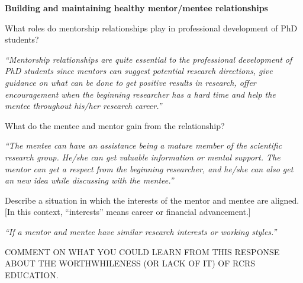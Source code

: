 \documentclass[portrait,11pt]{seminar}
\begin{document}
\bs
{\bf Building and maintaining healthy mentor/mentee relationships
}

\medskip

  What roles do mentorship relationships play in professional development of PhD students? 


{\it ``Mentorship relationships are quite essential to the professional development of PhD students since mentors can suggest potential research directions, give guidance on what can be done to get positive results in research, offer encouragement when the beginning researcher has a hard time and help the mentee throughout his/her research career.''}

 \es \bs

  What do the mentee and mentor gain from the relationship?



{\it ``The mentee can have an assistance being a mature member of the scientific research group. He/she can get valuable information or mental support. The mentor can get a respect from the beginning researcher, and he/she can also get an new idea while discussing with the mentee.''}


 \es 

\bs

  Describe a situation in which the interests of the mentor and mentee are aligned. [In this context, ``interests'' means career or financial advancement.]

\medskip

{\it ``If a mentor and mentee have similar research interests or working styles.''}

\medskip

COMMENT ON WHAT YOU COULD LEARN FROM THIS RESPONSE ABOUT THE WORTHWHILENESS (OR LACK OF IT) OF RCRS EDUCATION.

\es
\end{document}
